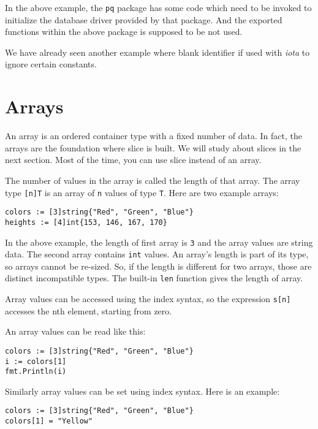 In the above example, the \texttt{pq} package has some code which need
to be invoked to initialize the database driver provided by that
package.  And the exported functions within the above package is
supposed to be not used.

We have already seen another example where blank identifier if used
with \textit{iota} to ignore certain constants.

\section{Arrays}
\label{sec:arrays}

An array is an ordered container type with a fixed number
of data.  In fact, the arrays are the foundation where slice is built.
We will study about slices in the next section.  Most of the time, you
can use slice instead of an array.

The number of values in the array is called the length of that array.
The array type \texttt{[n]T} is an array of \texttt{n} values of
type \texttt{T}.  Here are two example arrays:

\begin{lstlisting}[numbers=none]
colors := [3]string{"Red", "Green", "Blue"}
heights := [4]int{153, 146, 167, 170}
\end{lstlisting}

In the above example, the length of first array is \texttt{3} and the
array values are string data.  The second array contains \texttt{int}
values.  An array's length is part of its type, so arrays cannot be
re-sized.  So, if the length is different for two arrays, those are
distinct incompatible types. The built-in \texttt{len} function gives
the length of array.

Array values can be accessed using the index syntax, so the expression
\texttt{s[n]} accesses the nth element, starting from zero.

An array values can be read like this:

\begin{lstlisting}[numbers=none]
colors := [3]string{"Red", "Green", "Blue"}
i := colors[1]
fmt.Println(i)
\end{lstlisting}

Similarly array values can be set using index syntax.  Here is an
example:

\begin{lstlisting}[numbers=none]
colors := [3]string{"Red", "Green", "Blue"}
colors[1] = "Yellow"
\end{lstlisting}

